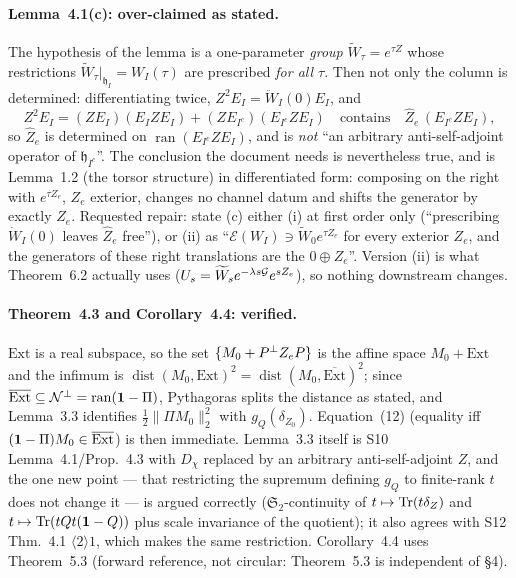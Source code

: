 \documentclass[11pt]{article}
\newcommand{\Wt}{\widetilde W}\newcommand{\Om}{\Omega}\newcommand{\Gm}{\Gamma}
\newcommand{\Stwo}{\mathfrak S_2}\newcommand{\Sone}{\mathfrak S_1}
\newcommand{\norm}[1]{\lVert #1\rVert}\newcommand{\abs}[1]{\lvert #1\rvert}
\newcommand{\Ext}{\mathrm{Ext}}\newcommand{\Nvis}{\mathcal N}
\DeclareMathOperator{\dist}{dist}\DeclareMathOperator{\ran}{ran}
\begin{document}
\paragraph{Lemma~4.1(c): over-claimed as stated.}  The hypothesis of the lemma is a
one-parameter \emph{group} $\Wt_\tau=e^{\tau Z}$ whose restrictions
$\Wt_\tau|_{\mathfrak h_I}=W_I(\tau)$ are prescribed \emph{for all $\tau$}.  Then not only
the column is determined: differentiating twice,
$Z^2E_I=\ddot W_I(0)E_I$, and
\begin{equation}\label{eq:secondorder}
 Z^2E_I=(ZE_I)(E_IZE_I)+(ZE_{I^c})(E_{I^c}ZE_I)
 \quad\text{contains}\quad \widehat Z_e\,(E_{I^c}ZE_I),
\end{equation}
so $\widehat Z_e$ is determined on $\ran(E_{I^c}ZE_I)$, and is \emph{not} ``an arbitrary
anti-self-adjoint operator of $\mathfrak h_{I^c}$''.  The conclusion the document needs is
nevertheless true, and is Lemma~1.2 (the torsor structure) in differentiated form:
composing on the right with $e^{\tau Z_e}$, $Z_e$ exterior, changes no channel datum and
shifts the generator by exactly $Z_e$.  Requested repair: state (c) either (i) at first
order only (``prescribing $\dot W_I(0)$ leaves $\widehat Z_e$ free''), or (ii) as
``$\mathcal E(W_I)\ni\Wt_0e^{\tau Z_e}$ for every exterior $Z_e$, and the generators of
these right translations are the $0\oplus Z_e$''.  Version (ii) is what Theorem~6.2
actually uses ($U_s=\Wt_se^{-\lambda s\Gs}e^{sZ_e}$), so nothing downstream changes.

\paragraph{Theorem~4.3 and Corollary~4.4: verified.}  $\Ext$ is a real subspace, so the
set $\{M_0+P^{\perp} Z_eP\}$ is the affine space $M_0+\Ext$ and the infimum is
$\dist(M_0,\Ext)^2=\dist(M_0,\overline{\Ext})^2$; since $\overline{\Ext}\subseteq
\Nvis^{\perp}=\ran(\one-\Pi)$, Pythagoras splits the distance as stated, and Lemma~3.3
identifies $\tfrac12\norm{\Pi M_0}_2^2$ with $g_Q(\delta_{Z_0})$.  Equation~(12) (equality
iff $(\one-\Pi)M_0\in\overline{\Ext}$) is then immediate.  Lemma~3.3 itself is S10
Lemma~4.1/Prop.~4.3 with $D_\chi$ replaced by an arbitrary anti-self-adjoint $Z$, and the
one new point --- that restricting the supremum defining $g_Q$ to finite-rank $t$ does not
change it --- is argued correctly ($\Stwo$-continuity of $t\mapsto\operatorname{Tr}(t\delta_Z)$ and
$t\mapsto\operatorname{Tr}(tQt(\mathbf 1-Q))$ plus scale invariance of the quotient); it also agrees with
S12 Thm.~4.1 $\langle2\rangle1$, which makes the same restriction.  Corollary~4.4 uses
Theorem~5.3 (forward reference, not circular: Theorem~5.3 is independent of \S4).
\end{document}
